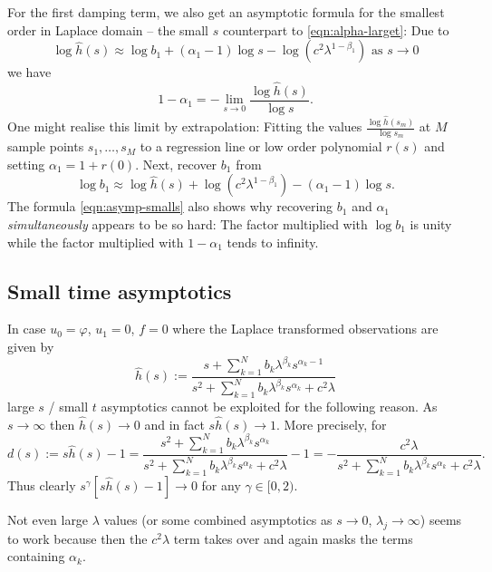 For the first damping term, we also get an asymptotic formula for the smallest order in Laplace domain -- the small $s$ counterpart to \eqref{eqn:alpha-larget}: Due to
\begin{equation}\label{eqn:asymp-smalls}
\log \hat{h}(s) \approx  \log b_1 +(\alpha_1-1)\log s -  \log(c^2\lambda^{1-\beta_1})\mbox{ as } s\to0
\end{equation}
we have 
\begin{equation}\label{eqn:alpha-smalls}
1-\alpha_1 = -\lim_{s\to0}\frac{\log \hat{h}(s)}{\log s}.
\end{equation}
One might realise this limit by extrapolation: Fitting the values $\frac{\log \hat{h}(s_m)}{\log s_m}$ at $M$ sample points $s_1,\ldots,s_M$ to a regression line or low order polynomial $r(s)$ and setting  $\alpha_1=1+r(0)$.
Next, recover $b_1$ from 
\[
\log b_1 \approx \log \hat{h}(s) + \log(c^2\lambda^{1-\beta_1})-(\alpha_1-1)\log s.
\]
The formula \eqref{eqn:asymp-smalls} also shows why recovering $b_1$ and $\alpha_1$ {\it simultaneously} appears to be so hard: The factor multiplied with $\log b_1$ is unity while the factor multiplied with $1-\alpha_1$ tends to infinity. 

\subsection{Small time asymptotics}
In case $u_0=\varphi$, $u_1=0$, $f=0$ where the Laplace transformed observations are given by 
\begin{equation}\label{eqn:hath_u0}
\hat{h}(s) := \frac{s + \sum_{k=1}^N b_k\lambda^{\beta_k} s^{\alpha_k-1}}{s^2 + \sum_{k=1}^N b_k\lambda^{\beta_k} s^{\alpha_k} + c^2\lambda}
\end{equation}
large $s$ / small $t$ asymptotics cannot be exploited for the following reason.
As $s\to \infty$ then $\hat{h}(s) \to 0$ and in fact $s\hat{h}(s) \to 1$.
More precisely, for
$$d(s) := s\hat{h}(s)-1= \frac{s^2 + \sum_{k=1}^N b_k \lambda^{\beta_k}s^{\alpha_k}}{s^2 + \sum_{k=1}^N b_k \lambda^{\beta_k} s^{\alpha_k} + c^2\lambda} - 1 
= -\frac{c^2\lambda}{s^2 + \sum_{k=1}^N b_k \lambda^{\beta_k} s^{\alpha_k} + c^2\lambda}.
$$
Thus clearly $s^{\gamma} [s\hat{h}(s)-1] \to 0$ for any $\gamma\in[0,2)$.

Not even large $\lambda$ values (or some combined asymptotics as $s\to0$, $\lambda_j\to\infty$) seems to work because then the $c^2\lambda$ term takes over and again masks the terms containing $\alpha_k$.

